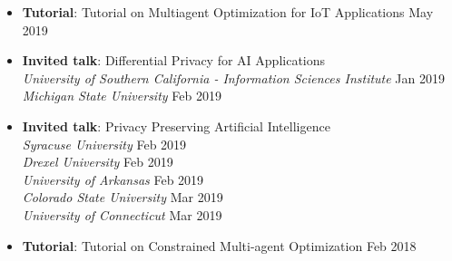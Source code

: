 \begin{itemize}
  \item {\bf Tutorial}: {Tutorial on Multiagent Optimization for IoT Applications} \hfill {May 2019}\\ 

  \item {\bf Invited talk}: Differential Privacy for AI Applications\\
  {\em University of Southern California - Information Sciences Institute} \hfill {Jan 2019}\\
  {\em Michigan State University} \hfill {Feb 2019}

  \item {\bf Invited talk}: Privacy Preserving Artificial Intelligence\\
  {\em Syracuse University} \hfill {Feb 2019}\\
  {\em Drexel University} \hfill {Feb 2019}\\
  {\em University of Arkansas} \hfill {Feb 2019}\\
  {\em Colorado State University} \hfill {Mar 2019}\\
  {\em University of Connecticut} \hfill {Mar 2019}






	\item {\bf Tutorial}: {Tutorial on Constrained Multi-agent Optimization} \hfill {Feb 2018}\\
  	


\end{itemize}
